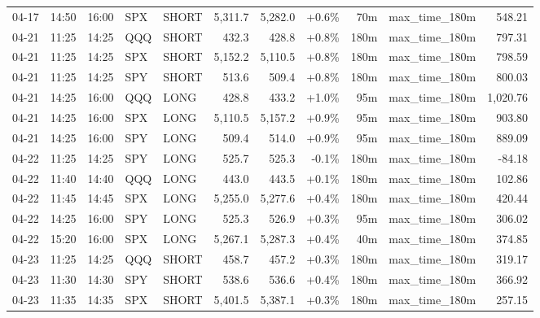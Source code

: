 \documentclass[11pt,a4paper,twoside]{article}
\begin{document}
\begin{center}
\begin{longtable}{>{\color{txtmain}}l l l l l r r r r >{\color{txtmain}}l r}
04-17 & 14:50 & 16:00 & SPX & SHORT & 5,311.7 & 5,282.0 & \textcolor{wingreen}{+0.6\%} & 70m & max\_time\_180m & \textcolor{wingreen}{548.21} \\
04-21 & 11:25 & 14:25 & QQQ & SHORT & 432.3 & 428.8 & \textcolor{wingreen}{+0.8\%} & 180m & max\_time\_180m & \textcolor{wingreen}{797.31} \\
04-21 & 11:25 & 14:25 & SPX & SHORT & 5,152.2 & 5,110.5 & \textcolor{wingreen}{+0.8\%} & 180m & max\_time\_180m & \textcolor{wingreen}{798.59} \\
04-21 & 11:25 & 14:25 & SPY & SHORT & 513.6 & 509.4 & \textcolor{wingreen}{+0.8\%} & 180m & max\_time\_180m & \textcolor{wingreen}{800.03} \\
04-21 & 14:25 & 16:00 & QQQ & LONG & 428.8 & 433.2 & \textcolor{wingreen}{+1.0\%} & 95m & max\_time\_180m & \textcolor{wingreen}{1,020.76} \\
04-21 & 14:25 & 16:00 & SPX & LONG & 5,110.5 & 5,157.2 & \textcolor{wingreen}{+0.9\%} & 95m & max\_time\_180m & \textcolor{wingreen}{903.80} \\
04-21 & 14:25 & 16:00 & SPY & LONG & 509.4 & 514.0 & \textcolor{wingreen}{+0.9\%} & 95m & max\_time\_180m & \textcolor{wingreen}{889.09} \\
04-22 & 11:25 & 14:25 & SPY & LONG & 525.7 & 525.3 & \textcolor{lossred}{-0.1\%} & 180m & max\_time\_180m & \textcolor{lossred}{-84.18} \\
04-22 & 11:40 & 14:40 & QQQ & LONG & 443.0 & 443.5 & \textcolor{wingreen}{+0.1\%} & 180m & max\_time\_180m & \textcolor{wingreen}{102.86} \\
04-22 & 11:45 & 14:45 & SPX & LONG & 5,255.0 & 5,277.6 & \textcolor{wingreen}{+0.4\%} & 180m & max\_time\_180m & \textcolor{wingreen}{420.44} \\
04-22 & 14:25 & 16:00 & SPY & LONG & 525.3 & 526.9 & \textcolor{wingreen}{+0.3\%} & 95m & max\_time\_180m & \textcolor{wingreen}{306.02} \\
04-22 & 15:20 & 16:00 & SPX & LONG & 5,267.1 & 5,287.3 & \textcolor{wingreen}{+0.4\%} & 40m & max\_time\_180m & \textcolor{wingreen}{374.85} \\
04-23 & 11:25 & 14:25 & QQQ & SHORT & 458.7 & 457.2 & \textcolor{wingreen}{+0.3\%} & 180m & max\_time\_180m & \textcolor{wingreen}{319.17} \\
04-23 & 11:30 & 14:30 & SPY & SHORT & 538.6 & 536.6 & \textcolor{wingreen}{+0.4\%} & 180m & max\_time\_180m & \textcolor{wingreen}{366.92} \\
04-23 & 11:35 & 14:35 & SPX & SHORT & 5,401.5 & 5,387.1 & \textcolor{wingreen}{+0.3\%} & 180m & max\_time\_180m & \textcolor{wingreen}{257.15} \\

\end{longtable}
\end{center}
\end{document}
